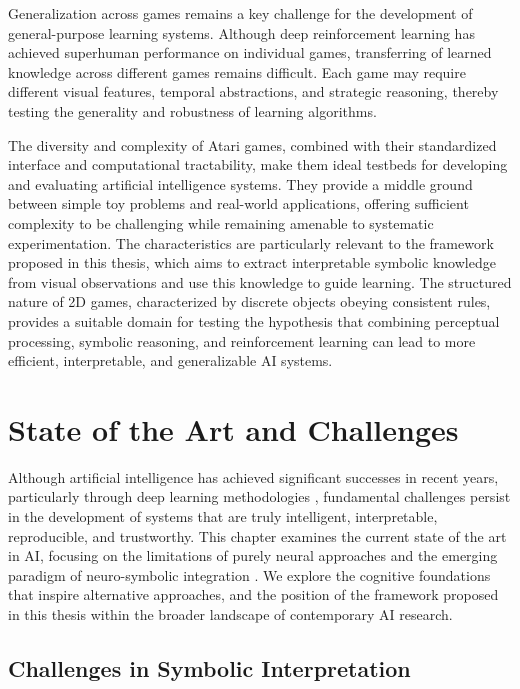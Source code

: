 \documentclass[12pt,a4paper]{report}
\begin{document}
Generalization across games remains a key challenge \cite{chiave62} for the development of general-purpose learning systems. 
Although deep reinforcement learning has achieved superhuman performance on individual games, transferring of learned knowledge across different games remains difficult. Each game may require different visual features, temporal abstractions, and strategic reasoning, thereby testing the generality and robustness of learning algorithms.  

The diversity and complexity of Atari games, combined with their standardized interface and computational tractability, make them ideal testbeds \cite{chiave61} for developing and evaluating artificial intelligence systems. They provide a middle ground between simple toy problems and real-world applications, offering sufficient complexity to be challenging while remaining amenable to systematic experimentation. The characteristics are particularly relevant to the framework proposed in this thesis, which aims to extract interpretable symbolic knowledge from visual observations and use this knowledge to guide learning. The structured nature of 2D games, characterized by discrete objects obeying consistent rules, provides a suitable domain for testing the hypothesis that combining perceptual processing, symbolic reasoning, and reinforcement learning can lead to more efficient, interpretable, and generalizable AI systems.



\chapter{State of the Art and Challenges}
Although artificial intelligence has achieved significant successes in recent years, particularly through deep learning methodologies \cite{chiave1}, fundamental challenges persist in the development of systems that are truly intelligent, interpretable, reproducible, and trustworthy. This chapter examines the current state of the art in AI, focusing on the limitations of purely neural approaches and the emerging paradigm of neuro-symbolic integration \cite{chiave2}. We explore the cognitive foundations that inspire alternative approaches, and the position of the framework proposed in this thesis within the broader landscape of contemporary AI research.

\section{Challenges in Symbolic Interpretation}
\end{document}
